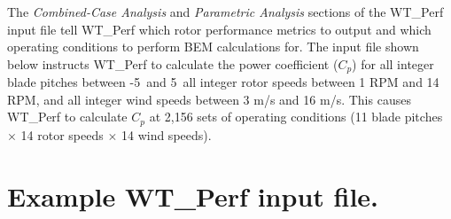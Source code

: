 The \textit{Combined-Case Analysis} and \textit{Parametric Analysis} sections of the WT\_Perf input file tell WT\_Perf which rotor performance metrics to output and which operating conditions to perform BEM calculations for. The input file shown below instructs WT\_Perf to calculate the power coefficient ($C_p$) for all integer blade pitches between -5\degree\ and 5\degree\, all integer rotor speeds between 1 RPM and 14 RPM, and all integer wind speeds between 3 m/s and 16 m/s. This causes WT\_Perf to calculate $C_p$ at 2,156 sets of operating conditions (11 blade pitches $\times$ 14 rotor speeds $\times$ 14 wind speeds). 

\section{Example WT\_Perf input file.} \label{sectionE-1}

